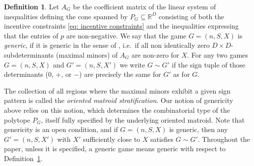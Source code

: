 \documentclass[11pt]{amsart}
\theoremstyle{definition}
\newtheorem{definition}[theorem]{Definition}
\numberwithin{subcase}{case}
\newcommand{\RR}{{\mathbb R}}
\begin{document}
\begin{definition} \label{de:Generic}
Let $A_G$ be the coefficient matrix of the linear system of inequalities defining the cone spanned by $P_G \subseteq \RR^D$ consisting of both the incentive constraints \eqref{eq: incentive constraints} and the inequalities expressing that the entries of $p$
are non-negative. We say that the game $G=(n,S,X)$ is \textit{generic}, if it is generic
in the sense of \cite[Construction 5.3]{CombCorrEquilibria}, i.e.\ if all non identically zero $D \times D$-subdeterminants (maximal minors) of $A_G$ are non-zero for $X$. For any two games $G=(n,S,X)$ and $G'=(n,S,X')$ we write $G \sim G'$ if the sign tuple of those determinants ($0$, $+$, or $-$) are precisely
the same for $G'$ as for $G$.
\end{definition}

The collection of all regions where the maximal minors exhibit a given sign pattern is called the \textit{oriented matroid stratification}. Our notion of genericity above relies on this notion, which determines the combinatorial type of the polytope $P_G$, itself fully specified by the underlying oriented matroid. Note that genericity is an open condition, and if $G=(n,S,X)$ is
generic, then any $G'=(n,S,X')$ with $X'$ sufficiently close to $X$
satisfies $G \sim G'$. Throughout the paper, unless it is specified, a generic game means generic with respect to Definition~\ref{de:Generic}.
\end{document}
